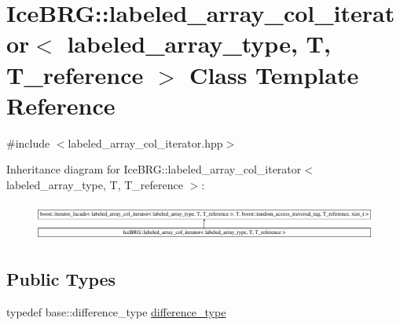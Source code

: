 \hypertarget{classIceBRG_1_1labeled__array__col__iterator}{}\section{Ice\+B\+R\+G\+:\+:labeled\+\_\+array\+\_\+col\+\_\+iterator$<$ labeled\+\_\+array\+\_\+type, T, T\+\_\+reference $>$ Class Template Reference}
\label{classIceBRG_1_1labeled__array__col__iterator}


{\ttfamily \#include $<$labeled\+\_\+array\+\_\+col\+\_\+iterator.\+hpp$>$}

Inheritance diagram for Ice\+B\+R\+G\+:\+:labeled\+\_\+array\+\_\+col\+\_\+iterator$<$ labeled\+\_\+array\+\_\+type, T, T\+\_\+reference $>$\+:\begin{figure}[H]
\begin{center}
\leavevmode
\includegraphics[height=1.250000cm]{classIceBRG_1_1labeled__array__col__iterator}
\end{center}
\end{figure}
\subsection*{Public Types}
\begin{DoxyCompactItemize}
\item 
typedef base\+::difference\+\_\+type \hyperlink{classIceBRG_1_1labeled__array__col__iterator_a90300154d7c3040eff6fd81b14ca4245}{difference\+\_\+type}
\end{DoxyCompactItemize}
